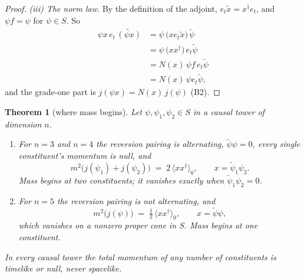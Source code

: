 \documentclass[11pt]{article}
\newtheorem{theorem}{Theorem}[section]
\theoremstyle{definition}
\newcommand{\rev}[1]{\widetilde{#1}}
\newcommand{\ip}[1]{\langle #1 \rangle}
\newcommand{\pstep}[1]{\par\smallskip\noindent\textit{#1.}\enspace}
\begin{document}
\begin{proof}
\pstep{(iii) The norm law} By the definition of the adjoint, $e_{t}\rev{x} = x^{\dagger}e_{t}$, and $\psi f = \psi$ for $\psi \in S$. So
\begin{align*}
\psi x\,e_{t}\,\rev{(\psi x)} &= \psi\,\bigl(x e_{t}\rev{x}\bigr)\,\rev{\psi} \\
&= \psi\,\bigl(xx^{\dagger}\bigr)\,e_{t}\rev{\psi} \\
&= N(x)\,\psi f\,e_{t}\rev{\psi} \\
&= N(x)\,\psi e_{t}\rev{\psi},
\end{align*}
and the grade-one part is $j(\psi x) = N(x)\,j(\psi)$ (B2).
\end{proof}

\begin{theorem}[where mass begins]\label{thm:onset}
Let $\psi, \psi_{1}, \psi_{2} \in S$ in a causal tower of dimension $n$.
\begin{enumerate}
\item[(i)] For $n = 3$ and $n = 4$ the reversion pairing is alternating, $\rev{\psi}\psi = 0$, every single constituent's momentum is null, and
\[
m^{2}\bigl(j(\psi_{1}) + j(\psi_{2})\bigr) \;=\; 2\,\ip{xx^{\dagger}}_{0}, \qquad x = \rev{\psi}_{1}\psi_{2}.
\]
Mass begins at two constituents; it vanishes exactly when $\rev{\psi}_{1}\psi_{2} = 0$.
\item[(ii)] For $n = 5$ the reversion pairing is not alternating, and
\[
m^{2}\bigl(j(\psi)\bigr) \;=\; \tfrac{1}{2}\,\ip{xx^{\dagger}}_{0}, \qquad x = \rev{\psi}\psi,
\]
which vanishes on a nonzero proper cone in $S$. Mass begins at one constituent.
\end{enumerate}
In every causal tower the total momentum of any number of constituents is timelike or null, never spacelike.
\end{theorem}
\end{document}
